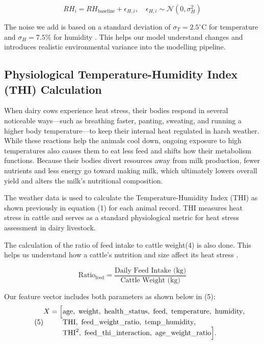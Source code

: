 \documentclass[conference]{IEEEtran}
\begin{document}
\begin{equation}
	RH_i = RH_{\text{baseline}} + \epsilon_{H,i}, \quad
	\epsilon_{H,i} \sim \mathcal{N}(0,\sigma_H^2)
	\tag{3}
\end{equation}
	
	The noise we add is based on a standard deviation of
	$\sigma_T = 2.5^{\circ}\mathrm{C}$ for temperature and
	$\sigma_H = 7.5\%$ for humidity \cite{ref2}.
	This helps our model understand changes and introduces realistic environmental variance into the modelling pipeline.
	
	\subsection{Physiological Temperature-Humidity Index (THI) Calculation}
	When dairy cows experience heat stress, their bodies respond in several noticeable ways—such as breathing faster, panting, sweating, and running a higher body temperature—to keep their internal heat regulated in harsh weather. While these reactions help the animals cool down, ongoing exposure to high temperatures also causes them to eat less feed and shifts how their metabolism functions. Because their bodies divert resources away from milk production, fewer nutrients and less energy go toward making milk, which ultimately lowers overall yield and alters the milk's nutritional composition.
	
	The weather data is used to calculate the Temperature-Humidity Index (THI) as shown previously in equation (1) for each animal record. THI measures heat stress in cattle and serves as a standard physiological metric for heat stress assessment in dairy livestock.
	
	The calculation of the ratio of feed intake to cattle weight(4) is also done. This helps us understand how a cattle's nutrition and size affect its heat stress \cite{ref11, ref12}.
	
	\begin{equation}
		\text{Ratio}_{\text{feed}}
		=
		\frac{\text{Daily Feed Intake (kg)}}
		{\text{Cattle Weight (kg)}}
		\tag{4}
	\end{equation}
	
	Our feature vector includes both parameters as shown below in (5):
\begin{equation}
	\tag{5}
	\begin{aligned}
		X=\Bigl[
		&\text{age},\ \text{weight},\ \text{health\_status},\ \text{feed},\ \text{temperature},\ \text{humidity},\\[-0.4em]
		&\text{THI},\ \text{feed\_weight\_ratio},\ \text{temp\_humidity},\\[-0.4em]
		&\text{THI}^{2},\ \text{feed\_thi\_interaction},\ \text{age\_weight\_ratio}
		\Bigr]. 
	\end{aligned}
\end{equation}
\end{document}
